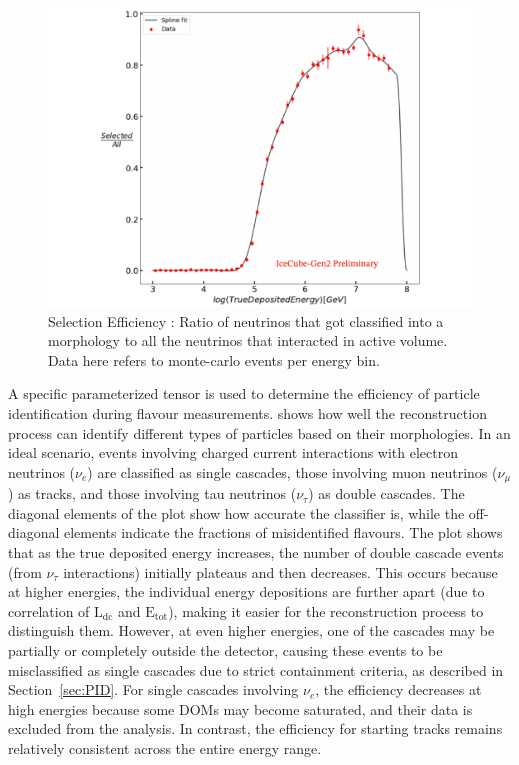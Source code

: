 \begin{figure}[h!]
    \centering
      \includegraphics{./figures/gen2/SelectionEff.pdf}
      \caption[Selection Efficiency of HESE-like selection in IceCube-Gen2]{Selection Efficiency : Ratio of neutrinos that got classified into a morphology to all the neutrinos that interacted in active volume. Data here refers to monte-carlo events per energy bin.}
  \end{figure}


A specific parameterized tensor is used to determine the efficiency of particle identification during flavour measurements.  shows how well the reconstruction process can identify different types of particles based on their morphologies. In an ideal scenario, events involving charged current interactions with electron neutrinos ($\nu_e$) are classified as single cascades, those involving muon neutrinos ($\nu_{\mu}$) as tracks, and those involving tau neutrinos ($\nu_{\tau}$) as double cascades. The diagonal elements of the plot show how accurate the classifier is, while the off-diagonal elements indicate the fractions of misidentified flavours. The plot shows that as the true deposited energy increases, the number of double cascade events (from $\nu_{\tau}$ interactions) initially plateaus and then decreases. This occurs because at higher energies, the individual energy depositions are further apart (due to correlation of $\mathrm{L}_{\mathrm{dc}}$ and $\mathrm{E}_{\mathrm{tot}}$), making it easier for the reconstruction process to distinguish them. However, at even higher energies, one of the cascades may be partially or completely outside the detector, causing these events to be misclassified as single cascades due to strict containment criteria, as described in Section~\ref{sec:PID}. For single cascades involving $\nu_e$, the efficiency decreases at high energies because some DOMs may become saturated, and their data is excluded from the analysis. In contrast, the efficiency for starting tracks remains relatively consistent across the entire energy range.


